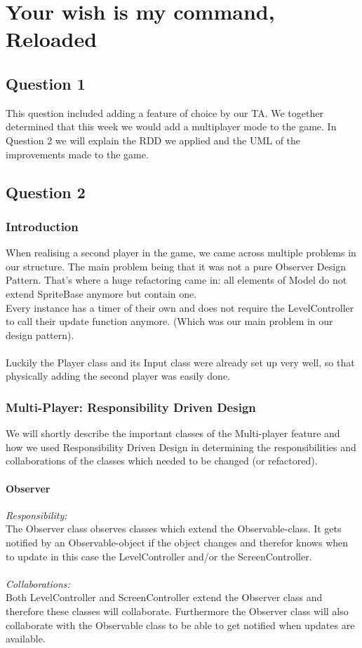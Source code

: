 \chapter{Your wish is my command, Reloaded}

\section{Question 1}
This question included adding a feature of choice by our TA. We together determined that this week we would add a multiplayer mode to the game. In Question 2 we will explain the RDD we applied and the UML of the improvements made to the game. 

\section{Question 2}

\subsection{Introduction}

When realising a second player in the game, we came across multiple problems in our structure. The main problem being that it was not a pure Observer Design Pattern. That's where a huge refactoring came in: all elements of Model do not extend SpriteBase anymore but contain one. \\ 
Every instance has a timer of their own and does not require the LevelController to call their update function anymore. (Which was our main problem in our design pattern). \\ \\
Luckily the Player class and its Input class were already set up very well, so that physically adding the second player was easily done. 

\subsection{Multi-Player: Responsibility Driven Design}
We will shortly describe the important classes of the Multi-player feature and how we used Responsibility Driven Design in determining the responsibilities and collaborations of the classes which needed to be changed (or refactored).  

\subsubsection{Observer}
\textit{Responsibility:} \\
The Observer class observes classes which extend the Observable-class. It gets notified by an Observable-object if the object changes and therefor knows when to update in this case the LevelController and/or the ScreenController. \\ \\
\textit{Collaborations:} \\
Both LevelController and ScreenController extend the Observer class and therefore these classes will collaborate. Furthermore the Observer class will also collaborate with the Observable class to be able to get notified when updates are available.


